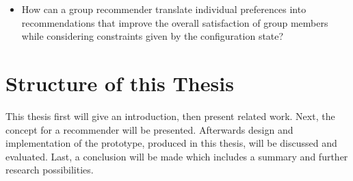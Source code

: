 \begin{itemize}
    \item How can a group recommender translate individual preferences into recommendations that improve the overall satisfaction of group members while considering constraints given by the configuration state? 
\end{itemize}


\section{Structure of this Thesis}
\label{sec:Introduction:Structure}

This thesis first will give an introduction, then present related work. Next, the concept for a recommender will be presented. Afterwards design and implementation of the prototype, produced in this thesis, will be discussed and evaluated. Last, a conclusion will be made which includes a summary and further research possibilities.
